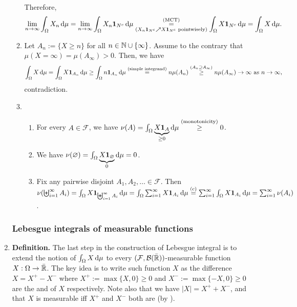 \begin{enumerate}
\begin{pf}
\begin{enumerate}
Therefore,
\[
\lim_{n\to\infty}\int_{\Omega}^{}X_n\odif{\mu}
=\lim_{n\to\infty}\int_{\Omega}^{}X_n\indic_{N^c}\odif{\mu}
\underset{(X_n\indic_{N^c}\nearrow X\indic_{N^c}\text{ pointwisely})}{\overset{\text{(MCT)}}{=}}
\int_{\Omega}^{}X\indic_{N^c}\odif{\mu}
=\int_{\Omega}^{}X\odif{\mu}.
\]
\item Let \(A_n:=\{X\ge n\}\) for all \(n\in\mathbb{N}\cup\{\infty\}\). Assume to the
contrary that \(\mu(X=\infty)=\mu(A_{\infty})>0\). Then, we have
\[
\int_{\Omega}^{}X\odif{\mu}=\int_{\Omega}^{}X\indic_{A_n}\odif{\mu}
\ge\int_{\Omega}^{}n\indic_{A_n}\odif{\mu}
\overset{\text{(simple integrand)}}{=}
n\mu(A_n)\overset{(A_n\supseteq A_{\infty})}{\ge}
n\mu(A_{\infty})\to\infty\text{ as \(n\to\infty\),}
\]
contradiction.
\item \begin{enumerate}[label={(\arabic*)}]
\item For every \(A\in\mathcal{F}\), we have
\(\nu(A)=\int_{\Omega}^{}\underbrace{X\indic_{A}}_{\ge
0}\odif{\mu}\overset{\text{(monotonicity)}}{\ge} 0\).
\item We have \(\nu(\varnothing)=\int_{\Omega}^{}\underbrace{X\indic_{\varnothing}}_{0}\odif{\mu}
=0\).
\item Fix any pairwise disjoint \(A_1,A_2,\dotsc\in\mathcal{F}\). Then
\(\nu(\biguplus_{i=1}^{\infty}A_i)
=\int_{\Omega}^{}X\indic_{\biguplus_{i=1}^{\infty}A_i}\odif{\mu}
=\int_{\Omega}^{}\sum_{i=1}^{\infty}X\indic_{A_i}\odif{\mu}
\overset{\text{(c)}}{=}\sum_{i=1}^{\infty}\int_{\Omega}^{}X\indic_{A_i}\odif{\mu}
=\sum_{i=1}^{\infty}\nu(A_i)\).
\end{enumerate}
\end{enumerate}
\end{pf}
\subsubsection*{Lebesgue integrals of measurable functions}
\item\label{it:leb-int-gen-def} \textbf{Definition.} The last step in the
construction of Lebesgue integral is to extend the notion of
\(\int_{\Omega}^{}X\odif{\mu}\) to every
\((\mathcal{F},\mathcal{B}(\bar{\mathbb{R}}))\)-measurable function
\(X:\Omega\to\bar{\mathbb{R}}\). The key idea is to write such function \(X\) as the
difference \(X=X^{+}-X^{-}\) where \(X^{+}:=\max\{X,0\}\ge 0\) and
\(X^{-}:=\max\{-X,0\}\ge 0\) are the  and  of \(X\) respectively. Note also that we have \(|X|=X^{+}+X^{-}\), and
that \(X\) is measurable iff \(X^{+}\) and \(X^{-}\) both are (by
).



\end{enumerate}
